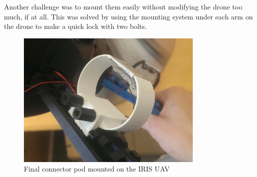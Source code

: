 Another challenge  was to mount them easily without modifying the drone too much, if at all. This was solved by using the mounting system under each arm on the drone to make a quick lock with two bolts.

\begin{figure}
	\centering
	\includegraphics[width=0.8\textwidth]{imgs/connectorpod_mounted}
	\caption{Final connector pod mounted on the IRIS UAV}
	\label{fig:connectorpod_mounted}
\end{figure}

